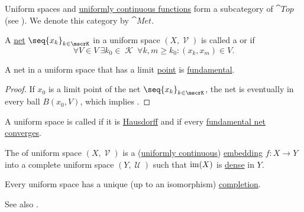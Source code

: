 \begin{definition}\label{def:category_of_uniform_spaces}
  Uniform spaces and \hyperref[def:uniform_continuity]{uniformly continuous functions} form a subcategory of \( \cat{Top} \) (see ). We denote this category by \( \cat{Met} \).
\end{definition}

\begin{definition}\label{def:fundamental_net}
  A \hyperref[def:topological_net]{net} \( \seq{ x_k }_{k \in \mscrK} \) in a uniform space \( (X, \mscrV) \) is called a  or  if
  \begin{equation*}
    \forall V \in V \ \exists k_0 \in \mscrK \ \forall k, m \geq k_0 : (x_k, x_m) \in V.
  \end{equation*}
\end{definition}

\begin{lemma}\label{thm:convergent_net_is_fundamental}
  A net in a uniform space that has a limit \hyperref[def:net_limit_point]{point} is \hyperref[def:fundamental_net]{fundamental}.
\end{lemma}
\begin{proof}
  If \( x_0 \) is a limit point of the net \( \seq{ x_k }_{k \in \mscrK} \), the net is eventually in every ball \( B(x_0, V) \), which implies .
\end{proof}

\begin{definition}\label{def:complete_uniform_space}
  A uniform space is called  if it is \hyperref[def:separation_axioms/T2]{Hausdorff} and if every \hyperref[def:fundamental_net]{fundamental net} \hyperref[def:net_limit_point]{converges}.

  The  of uniform space \( (X, \mscrV) \) is a (\hyperref[def:uniform_continuity]{uniformly continuous}) \hyperref[def:morphism_invertibility/left_cancellative]{embedding} \( f: X \to Y \) into a complete uniform space \( (Y, \mscrU) \) such that \( \operatorname{im}(X) \) is \hyperref[def:topologically_dense_set]{dense} in \( Y \).
\end{definition}

\begin{theorem}\label{thm:uniform_space_completion}
  Every uniform space has a unique (up to an isomorphism) \hyperref[def:complete_uniform_space]{completion}.

  See also .
\end{theorem}


